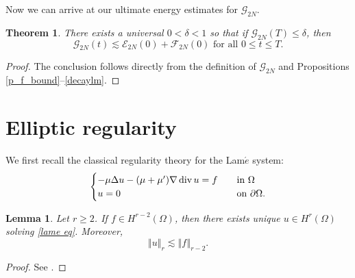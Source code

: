 \documentclass[a4paper,reqno,11pt]{amsart}
\newtheorem{lemma}[theorem]{Lemma}
\numberwithin{equation}{section}
\providecommand{\norm}[1]{\left\Vert#1\right\Vert}
\providecommand{\norm}[1]{\left\Vert#1\right\Vert}
\newtheorem{thm}[lem]{Theorem}
\begin{document}
Now we can arrive at our ultimate energy estimates for
$\mathcal{G}_{2N} $.
\begin{thm}\label{Ap}
There exists a universal $0 < \delta < 1$ so that if $
\mathcal{G}_{2N} (T) \le \delta$, then
\begin{equation}\label{Apriori}
 \mathcal{G}_{2N} (t) {\lesssim}\mathcal{E}_{2N} (0)+ \mathcal{F}_{2N}(0) \text{ for all }0 \le t \le
 T.
\end{equation}
\end{thm}
\begin{proof}
The conclusion follows directly from the definition of
$\mathcal{G}_{2N} $ and Propositions
\ref{p_f_bound}--\ref{decaylm}.
\end{proof}

\appendix

\section{Elliptic regularity}\label{section_appendix}

We first recall the classical regularity theory for the Lam$\acute{e}$ system:
\begin{equation}\label{lame eq}
\begin{cases}
-\mu\Delta u -(\mu+\mu')\nabla \operatorname{div} u =f  \quad &\hbox{in }\Omega
\\u=0\quad &\hbox{on }{\partial} \Omega.
\end{cases}
\end{equation}
\begin{lemma}\label{i_linear_lame}
Let $r\ge 2$. If $f\in H^{r-2}(\Omega)$, then there exists unique $u\in H^r(\Omega)$ solving \eqref{lame eq}. Moreover,
\begin{equation}
\norm{u}_{r}\lesssim\norm{f}_{r-2}.
\end{equation}
\end{lemma}
\begin{proof}
 See \cite{ADN}.
\end{proof}
\end{document}
